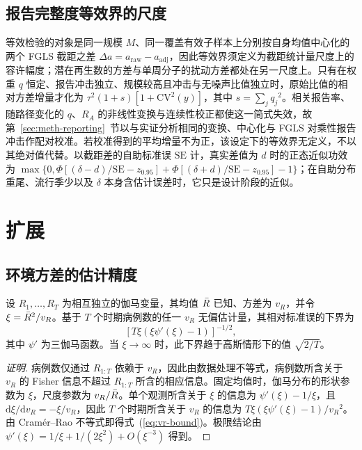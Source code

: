 \subsection{报告完整度等效界的尺度}
\label{app:tost-scale}

等效检验的对象是同一规模 $M$、同一覆盖有效子样本上分别按自身均值中心化的两个 FGLS 截距之差 $\Delta a=a_{\mathrm{raw}}-a_{\mathrm{adj}}$，因此等效界须定义为截距统计量尺度上的容许幅度；潜在再生数的方差与单周分子的扰动方差都处在另一尺度上。只有在权重 $q$ 恒定、报告冲击独立、规模较高且冲击与无噪声比值独立时，原始比值的相对方差增量才化为 $\tau^2(1+s)[1+\mathrm{CV}^2(y)]$，其中 $s=\sum_jq_j{}^2$。相关报告率、随路径变化的 $q$、$R_A$ 的非线性变换与连续性校正都使这一简式失效，故第~\ref{sec:meth-reporting}~节以与实证分析相同的变换、中心化与 FGLS 对乘性报告冲击作配对校准。若校准得到的平均增量不为正，该设定下的等效界无定义，不以其绝对值代替。以截距差的自助标准误 $\mathrm{SE}$ 计，真实差值为 $d$ 时的正态近似功效为 $\max\{0,\Phi[(\delta-d)/\mathrm{SE}-z_{0.95}]+\Phi[(\delta+d)/\mathrm{SE}-z_{0.95}]-1\}$；在自助分布重尾、流行季少以及 $\delta$ 本身含估计误差时，它只是设计阶段的近似。

\section{扩展}
\label{app:extensions}

\subsection{环境方差的估计精度}
\label{app:vr-precision}

\begin{proposition}[环境方差的估计精度]
\label{prop:vr-precision}
设 $R_1,\dots,R_T$ 为相互独立的伽马变量，其均值 $\bar{R}$ 已知、方差为 $v_R$，并令 $\xi=\bar{R}^2/v_R$。基于 $T$ 个时期病例数的任一 $v_R$ 无偏估计量，其相对标准误的下界为
\begin{equation}
  \left[T\xi\left(\xi\psi'(\xi)-1\right)\right]^{-1/2},
  \label{eq:vr-bound}
\end{equation}
其中 $\psi'$ 为三伽马函数。当 $\xi\to\infty$ 时，此下界趋于高斯情形下的值 $\sqrt{2/T}$。
\end{proposition}

\begin{proof}[证明]
病例数仅通过 $R_{1:T}$ 依赖于 $v_R$，因此由数据处理不等式，病例数所含关于 $v_R$ 的 Fisher 信息不超过 $R_{1:T}$ 所含的相应信息。固定均值时，伽马分布的形状参数为 $\xi$，尺度参数为 $v_R/\bar{R}$。单个观测所含关于 $\xi$ 的信息为 $\psi'(\xi)-1/\xi$，且 $\mathrm{d}\xi/\mathrm{d}v_R=-\xi/v_R$，因此 $T$ 个时期所含关于 $v_R$ 的信息为 $T\xi(\xi\psi'(\xi)-1)/v_R{}^2$。由 Cram\'er--Rao 不等式即得式~(\ref{eq:vr-bound})。极限结论由 $\psi'(\xi)=1/\xi+1/(2\xi^2)+O(\xi^{-3})$ 得到。
\end{proof}

